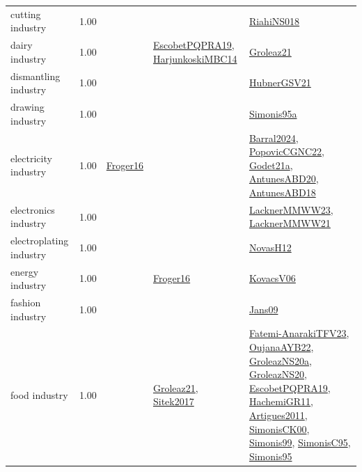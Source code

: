 {\begin{longtable}{p{3cm}r>{\raggedright\arraybackslash}p{6cm}>{\raggedright\arraybackslash}p{6cm}>{\raggedright\arraybackslash}p{8cm}}
\index{cutting industry}\index{Industries!cutting industry}cutting industry &  1.00 &  &  & \hyperref[detail:RiahiNS018]{RiahiNS018}\\
\index{dairy industry}\index{Industries!dairy industry}dairy industry &  1.00 &  & \hyperref[detail:EscobetPQPRA19]{EscobetPQPRA19}, \hyperref[detail:HarjunkoskiMBC14]{HarjunkoskiMBC14} & \hyperref[detail:Groleaz21]{Groleaz21}\\
\index{dismantling industry}\index{Industries!dismantling industry}dismantling industry &  1.00 &  &  & \hyperref[detail:HubnerGSV21]{HubnerGSV21}\\
\index{drawing industry}\index{Industries!drawing industry}drawing industry &  1.00 &  &  & \hyperref[detail:Simonis95a]{Simonis95a}\\
\index{electricity industry}\index{Industries!electricity industry}electricity industry &  1.00 & \hyperref[detail:Froger16]{Froger16} &  & \hyperref[detail:Barral2024]{Barral2024}, \hyperref[detail:PopovicCGNC22]{PopovicCGNC22}, \hyperref[detail:Godet21a]{Godet21a}, \hyperref[detail:AntunesABD20]{AntunesABD20}, \hyperref[detail:AntunesABD18]{AntunesABD18}\\
\index{electronics industry}\index{Industries!electronics industry}electronics industry &  1.00 &  &  & \hyperref[detail:LacknerMMWW23]{LacknerMMWW23}, \hyperref[detail:LacknerMMWW21]{LacknerMMWW21}\\
\index{electroplating industry}\index{Industries!electroplating industry}electroplating industry &  1.00 &  &  & \hyperref[detail:NovasH12]{NovasH12}\\
\index{energy industry}\index{Industries!energy industry}energy industry &  1.00 &  & \hyperref[detail:Froger16]{Froger16} & \hyperref[detail:KovacsV06]{KovacsV06}\\
\index{fashion industry}\index{Industries!fashion industry}fashion industry &  1.00 &  &  & \hyperref[detail:Jans09]{Jans09}\\
\index{food industry}\index{Industries!food industry}food industry &  1.00 &  & \hyperref[detail:Groleaz21]{Groleaz21}, \hyperref[detail:Sitek2017]{Sitek2017} & \hyperref[detail:Fatemi-AnarakiTFV23]{Fatemi-AnarakiTFV23}, \hyperref[detail:OujanaAYB22]{OujanaAYB22}, \hyperref[detail:GroleazNS20a]{GroleazNS20a}, \hyperref[detail:GroleazNS20]{GroleazNS20}, \hyperref[detail:EscobetPQPRA19]{EscobetPQPRA19}, \hyperref[detail:HachemiGR11]{HachemiGR11}, \hyperref[detail:Artigues2011]{Artigues2011}, \hyperref[detail:SimonisCK00]{SimonisCK00}, \hyperref[detail:Simonis99]{Simonis99}, \hyperref[detail:SimonisC95]{SimonisC95}, \hyperref[detail:Simonis95]{Simonis95}\\

\end{longtable}}
